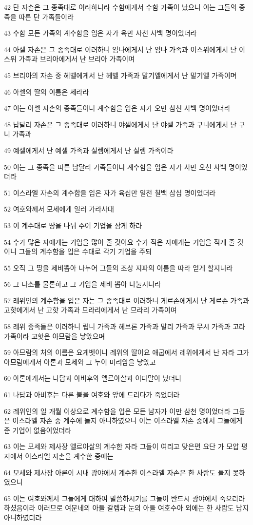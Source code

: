\par 42 단 자손은 그 종족대로 이러하니라 수함에게서 수함 가족이 났으니 이는 그들의 종족을 따른 단 가족들이라
\par 43 수함 모든 가족의 계수함을 입은 자가 육만 사천 사백 명이었더라
\par 44 아셀 자손은 그 종족대로 이러하니 임나에게서 난 임나 가족과 이스위에게서 난 이스위 가족과 브리아에게서 난 브리아 가족이며
\par 45 브리아의 자손 중 헤벨에게서 난 헤벨 가족과 말기엘에게서 난 말기엘 가족이며
\par 46 아셀의 딸의 이름은 세라라
\par 47 이는 아셀 자손의 종족들이니 계수함을 입은 자가 오만 삼천 사백 명이었더라
\par 48 납달리 자손은 그 종족대로 이러하니 야셀에게서 난 야셀 가족과 구니에게서 난 구니 가족과
\par 49 예셀에게서 난 예셀 가족과 실렘에게서 난 실렘 가족이라
\par 50 이는 그 종족을 따른 납달리 가족들이니 계수함을 입은 자가 사만 오천 사백 명이었더라
\par 51 이스라엘 자손의 계수함을 입은 자가 육십만 일천 칠백 삼십 명이었더라
\par 52 여호와께서 모세에게 일러 가라사대
\par 53 이 계수대로 땅을 나눠 주어 기업을 삼게 하라
\par 54 수가 많은 자에게는 기업을 많이 줄 것이요 수가 적은 자에게는 기업을 적게 줄 것이니 그들의 계수함을 입은 수대로 각기 기업을 주되
\par 55 오직 그 땅을 제비뽑아 나누어 그들의 조상 지파의 이름을 따라 얻게 할지니라
\par 56 그 다소를 물론하고 그 기업을 제비 뽑아 나눌지니라
\par 57 레위인의 계수함을 입은 자는 그 종족대로 이러하니 게르손에게서 난 게르손 가족과 고핫에게서 난 고핫 가족과 므라리에게서 난 므라리 가족이며
\par 58 레위 종족들은 이러하니 립니 가족과 헤브론 가족과 말리 가족과 무시 가족과 고라 가족이라 고핫은 아므람을 낳았으며
\par 59 아므람의 처의 이름은 요게벳이니 레위의 딸이요 애굽에서 레위에게서 난 자라 그가 아므람에게서 아론과 모세와 그 누이 미리암을 낳았고
\par 60 아론에게서는 나답과 아비후와 엘르아살과 이다말이 났더니
\par 61 나답과 아비후는 다른 불을 여호와 앞에 드리다가 죽었더라
\par 62 레위인의 일 개월 이상으로 계수함을 입은 모든 남자가 이만 삼천 명이었더라 그들은 이스라엘 자손 중 계수에 들지 아니하였으니 이는 이스라엘 자손 중에서 그들에게 준 기업이 없음이었더라
\par 63 이는 모세와 제사장 엘르아살의 계수한 자라 그들이 여리고 맞은편 요단 가 모압 평지에서 이스라엘 자손을 계수한 중에는
\par 64 모세와 제사장 아론이 시내 광야에서 계수한 이스라엘 자손은 한 사람도 들지 못하였으니
\par 65 이는 여호와께서 그들에게 대하여 말씀하시기를 그들이 반드시 광야에서 죽으리라 하셨음이라 이러므로 여분네의 아들 갈렙과 눈의 아들 여호수아 외에는 한 사람도 남지 아니하였더라

